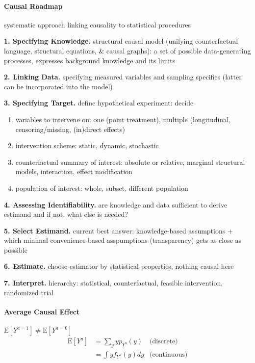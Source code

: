 \documentclass[8pt,oneside]{extarticle}
\begin{document}
\begin{multicols}{2}

\paragraph{\large Causal Roadmap} \citep{petersen2014causal} 
systematic approach linking causality to statistical procedures

\noindent \textbf{1. Specifying Knowledge.} structural causal model (unifying counterfactual language, structural equations, \& causal graphs): a set of possible data-generating processes, expresses background knowledge and its limits

\noindent \textbf{2. Linking Data.} specifying measured variables and sampling specifics (latter can be incorporated into the model)

\noindent \textbf{3. Specifying Target.} define hypothetical experiment: decide
\noindent\begin{enumerate}[itemsep=0em, topsep=0pt, partopsep=0pt,parsep=0pt]
\setlength{\itemsep}{0pt}%
\setlength{\parskip}{0pt}
\item variables to intervene on: one (point treatment), multiple (longitudinal, censoring/missing, (in)direct effects)
\item intervention scheme: static, dynamic, stochastic
\item counterfactual summary of interest: absolute or relative, marginal structural models, interaction, effect modification
\item population of interest: whole, subset, different population
\end{enumerate}

\noindent \textbf{4. Assessing Identifiability.} are knowledge and data sufficient to derive estimand and if not, what else is needed?

\noindent \textbf{5. Select Estimand.} current best answer: knowledge-based assumptions $+$ which minimal convenience-based asspumptions (transparency) gets as close as possible

\noindent \textbf{6. Estimate.} choose estimator by statistical properties, nothing causal here

\noindent \textbf{7. Interpret.} hierarchy: statistical, counterfactual, feasible intervention, randomized trial


\paragraph{\large Average Causal Effect} $\mathrm{E}\left[Y^{a=1}\right] \neq \mathrm{E}\left[Y^{a=0}\right]$
\begin{align*}
\mathrm{E}\left[Y^{a}\right]   &=  \sum_yyp_{Y^a}(y)  &\text{(discrete)}\\
   &=  \int yf_{Y^a}(y)dy &\text{(continuous)}
\end{align*}


\end{multicols}
\end{document}
